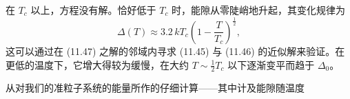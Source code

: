 在 $T_{c}$ 以上，方程没有解。恰好低于 $T_{c}$ 时，能隙从零陡峭地升起，其变化规律为
\begin{equation*}
\Delta(T)\approx 3.2\,kT_{c}\left(1-\frac{T}{T_{c}}\right)^{\frac{1}{2}},
\tag{11.49}
\end{equation*}
这可以通过在 (11.47) 之解的邻域内寻求 (11.45) 与 (11.46) 的近似解来验证。在更低的温度下，它增大得较为缓慢，在大约 $T\sim\frac{1}{2}T_{c}$ 以下逐渐变平而趋于 $\Delta_{0}$。

从对我们的准粒子系统的能量所作的仔细计算——其中计及能隙随温度
